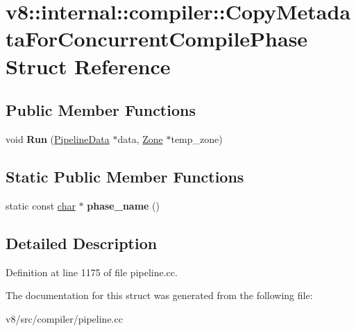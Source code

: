 \hypertarget{structv8_1_1internal_1_1compiler_1_1CopyMetadataForConcurrentCompilePhase}{}\section{v8\+:\+:internal\+:\+:compiler\+:\+:Copy\+Metadata\+For\+Concurrent\+Compile\+Phase Struct Reference}
\label{structv8_1_1internal_1_1compiler_1_1CopyMetadataForConcurrentCompilePhase}
\subsection*{Public Member Functions}
\begin{DoxyCompactItemize}
\item 
\mbox{\label{structv8_1_1internal_1_1compiler_1_1CopyMetadataForConcurrentCompilePhase_a5f671e5e3b16eadd912356d4b7ce6816}} 
void {\bfseries Run} (\mbox{\hyperlink{classv8_1_1internal_1_1compiler_1_1PipelineData}{Pipeline\+Data}} $\ast$data, \mbox{\hyperlink{classv8_1_1internal_1_1Zone}{Zone}} $\ast$temp\+\_\+zone)
\end{DoxyCompactItemize}
\subsection*{Static Public Member Functions}
\begin{DoxyCompactItemize}
\item 
\mbox{\label{structv8_1_1internal_1_1compiler_1_1CopyMetadataForConcurrentCompilePhase_a907ab6718c9ff10bb0c9ef54d808a230}} 
static const \mbox{\hyperlink{classchar}{char}} $\ast$ {\bfseries phase\+\_\+name} ()
\end{DoxyCompactItemize}


\subsection{Detailed Description}


Definition at line 1175 of file pipeline.\+cc.



The documentation for this struct was generated from the following file\+:\begin{DoxyCompactItemize}
\item 
v8/src/compiler/pipeline.\+cc\end{DoxyCompactItemize}
